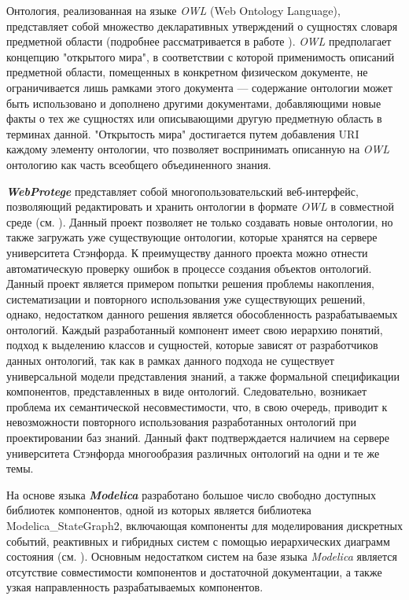 Онтология, реализованная на языке \textit{OWL} (Web Ontology Language), представляет собой множество декларативных утверждений о сущностях словаря предметной области (подробнее рассматривается в работе ). \textit{OWL} предполагает концепцию "открытого мира"{}, в соответствии с которой применимость описаний предметной области, помещенных в конкретном физическом документе, не ограничивается лишь рамками этого документа --- содержание онтологии может быть использовано и дополнено другими документами, добавляющими новые факты о тех же сущностях или описывающими другую предметную область в терминах данной. "Открытость мира"{} достигается путем добавления URI каждому элементу онтологии, что позволяет воспринимать описанную на \textit{OWL} онтологию как часть всеобщего объединенного знания.

\textbf{\textit{WebProtege}} представляет собой многопользовательский веб-интерфейс, позволяющий редактировать и хранить онтологии в формате \textit{OWL} в совместной среде (см. ). Данный проект позволяет не только создавать новые онтологии, но также загружать уже существующие онтологии, которые хранятся на сервере университета Стэнфорда. К преимуществу данного проекта можно отнести автоматическую проверку ошибок в процессе создания объектов онтологий. Данный проект является примером попытки решения проблемы накопления, систематизации и повторного использования уже существующих решений, однако, недостатком данного решения является обособленность разрабатываемых онтологий. Каждый разработанный компонент имеет свою иерархию понятий, подход к выделению классов и сущностей, которые зависят от разработчиков данных онтологий, так как в рамках данного подхода не существует универсальной модели представления знаний, а также формальной спецификации компонентов, представленных в виде онтологий. Следовательно, возникает проблема их семантической несовместимости, что, в свою очередь, приводит к невозможности повторного использования разработанных онтологий при проектировании баз знаний. Данный факт подтверждается наличием на сервере университета Стэнфорда многообразия различных онтологий на одни и те же темы.

На основе языка \textbf{\textit{Modelica}} разработано большое число свободно доступных библиотек компонентов, одной из которых является библиотека Modelica\_StateGraph2, включающая компоненты для моделирования дискретных событий, реактивных и гибридных систем с помощью иерархических диаграмм состояния (см. ). Основным недостатком систем на базе языка \textit{Modelica} является отсутствие совместимости компонентов и достаточной документации, а также узкая направленность разрабатываемых компонентов.

